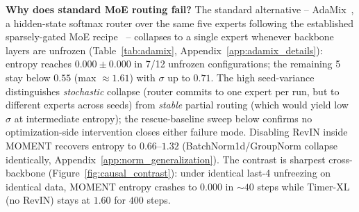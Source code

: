 \documentclass{article}
\begin{document}
{ \textbf{Why does standard MoE routing fail?} The standard alternative -- AdaMix~\citep{wang2022adamix}, a hidden-state softmax router over the same five experts following the established sparsely-gated MoE recipe~\citep{fedus2022switch} -- collapses to a single expert whenever backbone layers are unfrozen (Table~\ref{tab:adamix}, Appendix~\ref{app:adamix_details}): entropy reaches $0.000\pm0.000$ in 7/12 unfrozen configurations; the remaining 5 stay below $0.55$ (max ${\approx}1.61$) with $\sigma$ up to $0.71$. The high seed-variance distinguishes \emph{stochastic} collapse (router commits to one expert per run, but to different experts across seeds) from \emph{stable} partial routing (which would yield low $\sigma$ at intermediate entropy); the rescue-baseline sweep below confirms no optimization-side intervention closes either failure mode. Disabling RevIN inside MOMENT recovers entropy to $0.66$--$1.32$ (BatchNorm1d/GroupNorm collapse identically, Appendix~\ref{app:norm_generalization}). The contrast is sharpest cross-backbone (Figure~\ref{fig:causal_contrast}): under identical last-4 unfreezing on identical data, MOMENT entropy crashes to $0.000$ in ${\sim}40$ steps while Timer-XL (no RevIN) stays at $1.60$ for $400$ steps.}
\end{document}
